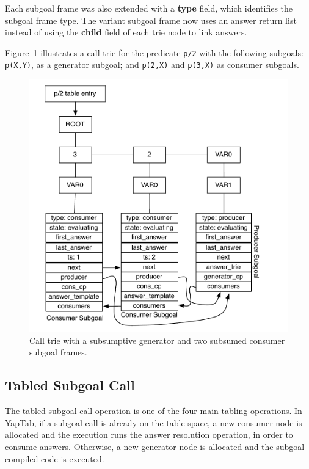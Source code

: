 Each subgoal frame was also extended with a \textbf{type} field, which identifies the subgoal frame type.
The variant subgoal frame now uses an answer return list instead of using the \textbf{child} field of
each trie node to link answers.

Figure~\ref{fig:subgoal_frames} illustrates a call trie for the predicate \texttt{p/2}
with the following subgoals: \texttt{p(X,Y)}, as a generator subgoal; and \texttt{p(2,X)} and
\texttt{p(3,X)} as consumer subgoals.

\begin{figure}[H]
  \centering
    \includegraphics[scale=0.6]{subgoal_frames.pdf}
  \caption{Call trie with a subsumptive generator and two subsumed consumer subgoal frames.}
  \label{fig:subgoal_frames}
\end{figure}

\subsection{Tabled Subgoal Call}

The tabled subgoal call operation is one of the four main tabling operations. In YapTab,
if a subgoal call is already on the table space, a new consumer node is allocated and
the execution runs the answer resolution operation, in order to consume answers.
Otherwise, a new generator node is allocated and the subgoal compiled code is executed.

